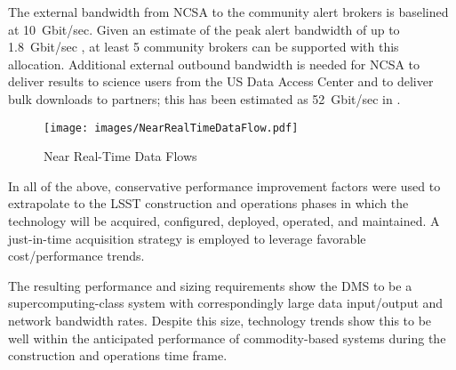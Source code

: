 The external bandwidth from NCSA to the community alert brokers is baselined at 10~Gbit/sec.
Given an estimate of the peak alert bandwidth of up to 1.8~Gbit/sec , at least 5 community brokers can be supported with this allocation.
Additional external outbound bandwidth is needed for NCSA to deliver results to science users from the US Data Access Center and to deliver bulk downloads to partners; this has been estimated as 52~Gbit/sec in .


\begin{figure}
\centering
\texttt{[image: images/NearRealTimeDataFlow.pdf]}
\caption{Near Real-Time Data Flows}
\label{fig:near-real-time-flows}
\end{figure}

In all of the above, conservative performance improvement factors
were used to extrapolate to the LSST construction and operations phases in
which the technology will be acquired, configured, deployed, operated, and
maintained. A just-in-time acquisition strategy is employed to leverage
favorable cost/performance trends.

The resulting performance and sizing requirements show the DMS to be a
supercomputing-class system with correspondingly large data input/output and
network bandwidth rates.  Despite this size, technology trends show this to be
well within the anticipated performance of commodity-based systems during the
construction and operations time frame.
